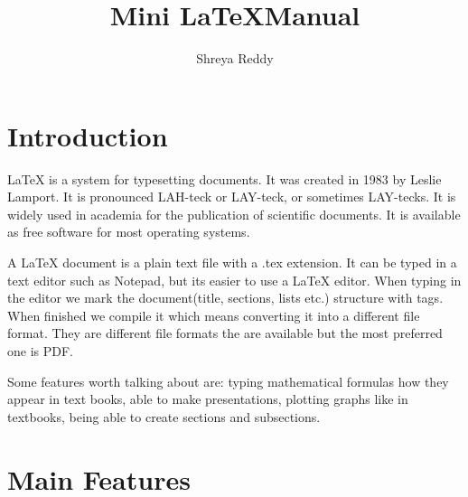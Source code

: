 \documentclass[11pt,twocolumn]{article}
\begin{document}
\title{Mini \LaTeX  Manual}
\author{Shreya Reddy}
\maketitle

\section{Introduction}

{\LaTeX} is a system for typesetting documents. It was created in 1983 by Leslie Lamport. It is pronounced LAH-teck or LAY-teck, or sometimes LAY-tecks\cite{overleaf1}. It is widely used in academia for the publication of scientific documents. It is available as free software for most operating systems.

\noindent A {\LaTeX} document is a plain text file with a .tex extension. It can be typed in a text editor such as Notepad, but its easier to use a {\LaTeX} editor. When typing in the editor we mark the document(title, sections,  lists etc.) structure with tags. When finished we compile it which means converting it into a different file format. They are different file formats the are available but the most preferred one is PDF. 

Some features worth talking about are: typing mathematical formulas how they appear in text books, able to make presentations, plotting graphs like in textbooks, being able to create sections and subsections.

\section{Main Features}
\end{document}

